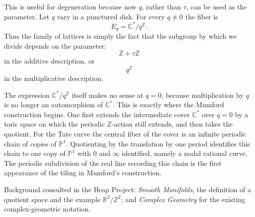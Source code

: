 \medskip\noindent
This is useful for degeneration because now
$q$, rather than $\tau$, can be used as the
parameter. Let $q$ vary in a punctured disk.
For every $q\neq0$ the fiber is
$$
E_q=\mathbb{C}^*/q^{\mathbb{Z}}.
$$
Thus the family of lattices is simply the
fact that the subgroup by which we divide
depends on the parameter:
$$
\mathbb{Z}+\tau\mathbb{Z}
$$
in the additive description, or
$$
q^{\mathbb{Z}}
$$
in the multiplicative description.

\medskip\noindent
The expression
$\mathbb{C}^*/q^{\mathbb{Z}}$ itself makes
no sense at $q=0$, because multiplication by
$q$ is no longer an automorphism of
$\mathbb{C}^*$. This is exactly where the
Mumford construction begins. One first
extends the intermediate cover
$\mathbb{C}^*$ over $q=0$ by a toric space
on which the periodic $\mathbb{Z}$-action
still extends, and then takes the quotient.
For the Tate curve the central fiber of the
cover is an infinite periodic chain of copies
of $\mathbb{P}^1$. Quotienting by the
translation by one period identifies this
chain to one copy of $\mathbb{P}^1$ with
$0$ and $\infty$ identified, namely a nodal
rational curve. The periodic subdivision of
the real line recording this chain is the
first appearance of the tiling in Mumford's
construction.

\medskip\noindent
Background consulted in the Heap Project:
\emph{Smooth Manifolds}, the definition of
a quotient space and the example
$\mathbb{R}^2/\mathbb{Z}^2$; and
\emph{Complex Geometry} for the existing
complex-geometric notation.





